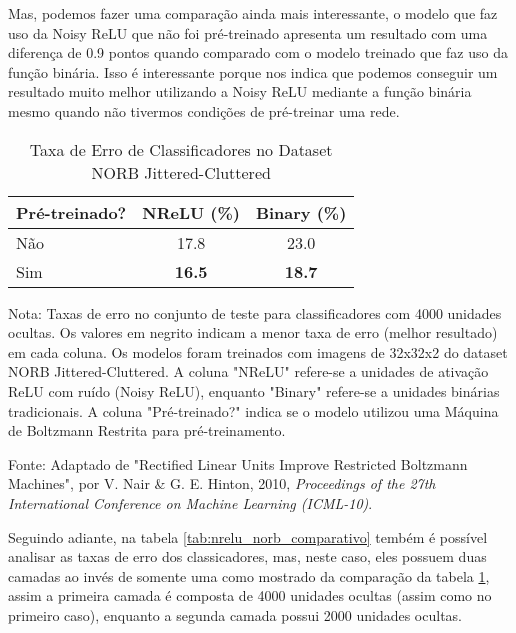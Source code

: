 Mas, podemos fazer uma comparação ainda mais interessante, o modelo que faz uso da Noisy ReLU que não foi pré-treinado apresenta um resultado com uma diferença de 0.9 pontos quando comparado com o modelo treinado que faz uso da função binária. Isso é interessante porque nos indica que podemos conseguir um resultado muito melhor utilizando a Noisy ReLU mediante a função binária mesmo quando não tivermos condições de pré-treinar uma rede.

\begin{table}[ht]
    \centering
    \begin{threeparttable}
        \caption{Taxa de Erro de Classificadores no Dataset NORB Jittered-Cluttered}
        \label{tab:norb_error_rate}
        \begin{tabular}{lcc}
            \toprule
            \textbf{Pré-treinado?} & \textbf{NReLU (\%)} & \textbf{Binary (\%)} \\
            \midrule
            
            Não & 17.8 & 23.0 \\
            Sim & \textbf{16.5} & \textbf{18.7} \\
            
            \bottomrule
        \end{tabular}
        
        \begin{tablenotes}[para]
            \small
            \item[] Nota: Taxas de erro no conjunto de teste para classificadores com 4000 unidades ocultas. Os valores em negrito indicam a menor taxa de erro (melhor resultado) em cada coluna. Os modelos foram treinados com imagens de 32x32x2 do dataset NORB Jittered-Cluttered. A coluna "NReLU" refere-se a unidades de ativação ReLU com ruído (Noisy ReLU), enquanto "Binary" refere-se a unidades binárias tradicionais. A coluna "Pré-treinado?" indica se o modelo utilizou uma Máquina de Boltzmann Restrita para pré-treinamento.
            \item[] Fonte: Adaptado de "Rectified Linear Units Improve Restricted Boltzmann Machines", por V. Nair \& G. E. Hinton, 2010, \textit{Proceedings of the 27th International Conference on Machine Learning (ICML-10)}.
        \end{tablenotes}
        
    \end{threeparttable}
\end{table}

Seguindo adiante, na tabela \ref{tab:nrelu_norb_comparativo} tembém é possível analisar as taxas de erro dos classicadores, mas, neste caso, eles possuem duas camadas ao invés de somente uma como mostrado da comparação da tabela \ref{tab:norb_error_rate}, assim a primeira camada é composta de 4000 unidades ocultas (assim como no primeiro caso), enquanto a segunda camada possui 2000 unidades ocultas. 

